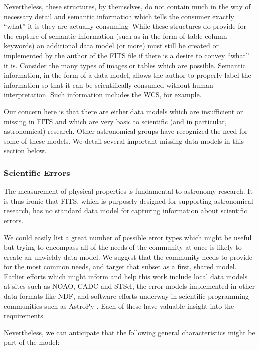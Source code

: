 \documentclass[final,authoryear,5p,times,twocolumn]{elsarticle}
\begin{document}
Nevertheless, these structures, by themselves, do not contain much in
the way of necessary detail and semantic information which tells the
consumer exactly ``what'' it is they are actually consuming. While these
structures do provide for the capture of semantic information (such as
in the form of table column keywords) an additional data model (or
more) must still be created or implemented by the author of the FITS
file if there is a desire to convey ``what'' it is. Consider the many
types of images or tables which are possible. Semantic information, in
the form of a data model, allows the author to properly label the
information so that it can be scientifically consumed without human
interpretation. Such information includes the WCS, for example.


Our concern here is that there are either data models which are
insufficient or missing in FITS and which are very basic to scientific
(and in particular, astronomical) research. Other astronomical groups
have recognized the need for some of these models. We detail
several important missing data models in this section below.

\subsubsection{Scientific Errors}


The measurement of physical properties is fundamental to astronomy
research. It is thus ironic that FITS, which is purposely designed for
supporting astronomical research, has no standard data model for
capturing information about scientific errors.


We could easily list a great number of possible error types which
might be useful but trying to encompass all of the needs of the
community at once is likely to create an unwieldy data model. We
suggest that the community needs to provide for the most common needs,
and target that subset as a first, shared model. Earlier efforts which
might inform and help this work include local data models at sites
such as NOAO, CADC \citep{2012ASPC..461..339D} and STScI, the error
models implemented in other data formats like NDF, and software
efforts underway in scientific programming communities such as AstroPy
\citep{2013A&A...558A..33A}. Each of these have valuable insight into
the requirements.


Nevertheless, we can anticipate that the following general
characteristics might be part of the model:
\end{document}

